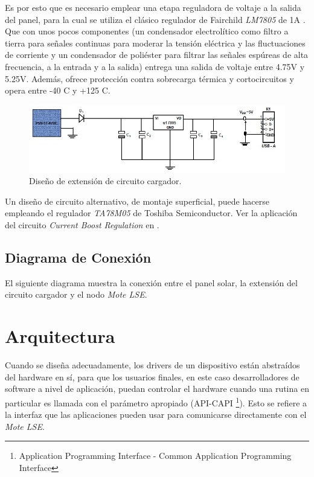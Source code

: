 {Es por esto que es necesario emplear una etapa reguladora de voltaje a la salida del panel, para la cual se utiliza el clásico regulador de Fairchild \textit{LM7805} de 1A \citep{7805}. Que con unos pocos componentes (un condensador electrolítico como filtro a tierra para señales continuas para moderar la tensión eléctrica y las fluctuaciones de corriente y un condensador de poliéster para filtrar las señales espúreas de alta frecuencia, a la entrada y a la salida) entrega una salida de voltaje entre 4.75V y 5.25V. Además, ofrece protección contra sobrecarga térmica y cortocircuitos y opera entre -40 \grados C y +125 \grados C.

\begin{figure}[h!]
	\centering
    \includegraphics[width=1\textwidth]{./Figures/circuito.jpg}
    	\caption{Diseño de extensión de circuito cargador.}
	\label{fig:circuito}
\end{figure}

Un diseño de circuito alternativo, de montaje superficial, puede hacerse empleando el regulador \textit{TA78M05} de Toshiba Semiconductor. Ver la aplicación del circuito \textit{Current Boost Regulation} en \citep{78M05}.


\subsection{Diagrama de Conexión}
\label{subsec:conexión}
El siguiente diagrama muestra la conexión entre el panel solar, la extensión del circuito cargador y el nodo \textit{Mote LSE}.

\section{Arquitectura}
\label{sec:arq}
Cuando se diseña adecuadamente, los drivers de un dispositivo están abstraídos del hardware en sí, para que los usuarios finales, en este caso desarrolladores de software a nivel de aplicación, puedan controlar el hardware cuando una rutina en particular es llamada con el parámetro apropiado (API-CAPI \footnote{Application Programming Interface - Common Application Programming Interface}). Esto se refiere a la interfaz que las aplicaciones pueden usar para comunicarse directamente con el \textit{Mote LSE}.

}
